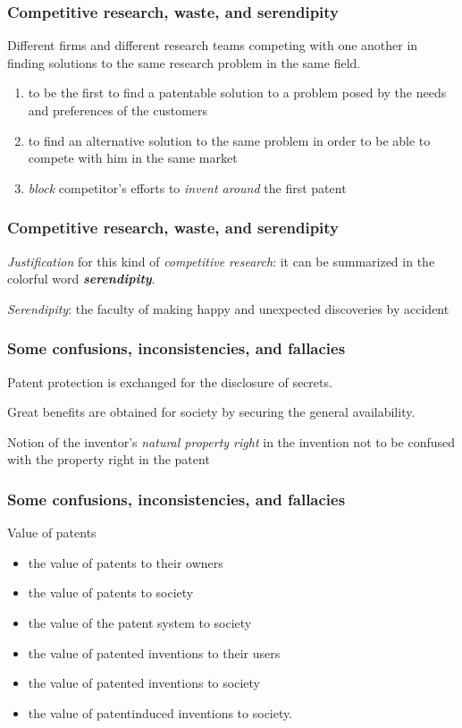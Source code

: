 \begin{frame}
\frametitle{Competitive research, waste, and serendipity}
Different firms and different research teams competing with one another in finding solutions to the same research problem in the same field.
\begin{enumerate}
	\item to be the first to find a patentable solution to a problem posed by the needs and preferences of the customers
    \item to find an alternative solution to the same problem in order to be able to compete with him in the same market
    \item \textit{block} competitor's efforts to \textit{invent around} the first patent
\end{enumerate}
\end{frame}


\begin{frame}
\frametitle{Competitive research, waste, and serendipity}
\textit{Justification} for this kind of \textit{competitive research}: it can be summarized in the colorful word \textit{\textbf{serendipity}}. 

\textit{Serendipity}: the faculty of making happy and unexpected discoveries by accident
\end{frame}

\begin{frame}
\frametitle{Some confusions, inconsistencies, and fallacies}
Patent protection is exchanged for the disclosure of secrets.

Great benefits are obtained for society by securing the general availability.

Notion of the inventor’s \textit{natural property right} in the invention not to be confused with the property right in the patent
\end{frame}


\begin{frame}
\frametitle{Some confusions, inconsistencies, and fallacies}
Value of patents
\begin{itemize}
	\item the value of patents to their owners
    \item the value of patents to society
    \item the value of the patent system to society
    \item the value of patented inventions to their users
    \item the value of patented inventions to society
    \item the value of patentinduced inventions to society.   \end{itemize}
\end{frame}

